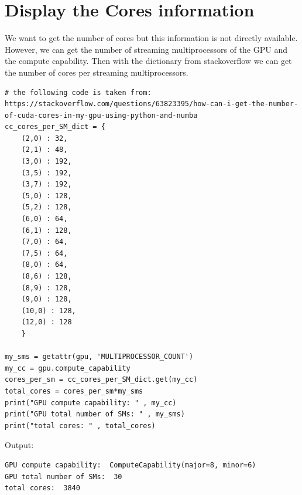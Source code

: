 \documentclass{report}
\begin{document}
\section{Display the Cores information}
We want to get the number of cores but this information is not directly available. However, we can get the number of streaming multiprocessors of the GPU and the compute capability. Then with the dictionary from stackoverflow we can get the number of cores per streaming multiprocessors.
\begin{lstlisting}
# the following code is taken from: https://stackoverflow.com/questions/63823395/how-can-i-get-the-number-of-cuda-cores-in-my-gpu-using-python-and-numba
cc_cores_per_SM_dict = {
    (2,0) : 32,
    (2,1) : 48,
    (3,0) : 192,
    (3,5) : 192,
    (3,7) : 192,
    (5,0) : 128,
    (5,2) : 128,
    (6,0) : 64,
    (6,1) : 128,
    (7,0) : 64,
    (7,5) : 64,
    (8,0) : 64,
    (8,6) : 128,
    (8,9) : 128,
    (9,0) : 128,
    (10,0) : 128,
    (12,0) : 128
    }

my_sms = getattr(gpu, 'MULTIPROCESSOR_COUNT')
my_cc = gpu.compute_capability
cores_per_sm = cc_cores_per_SM_dict.get(my_cc)
total_cores = cores_per_sm*my_sms
print("GPU compute capability: " , my_cc)
print("GPU total number of SMs: " , my_sms)
print("total cores: " , total_cores)
\end{lstlisting}
Output:
\begin{verbatim}
GPU compute capability:  ComputeCapability(major=8, minor=6)
GPU total number of SMs:  30
total cores:  3840
\end{verbatim}
\end{document}
